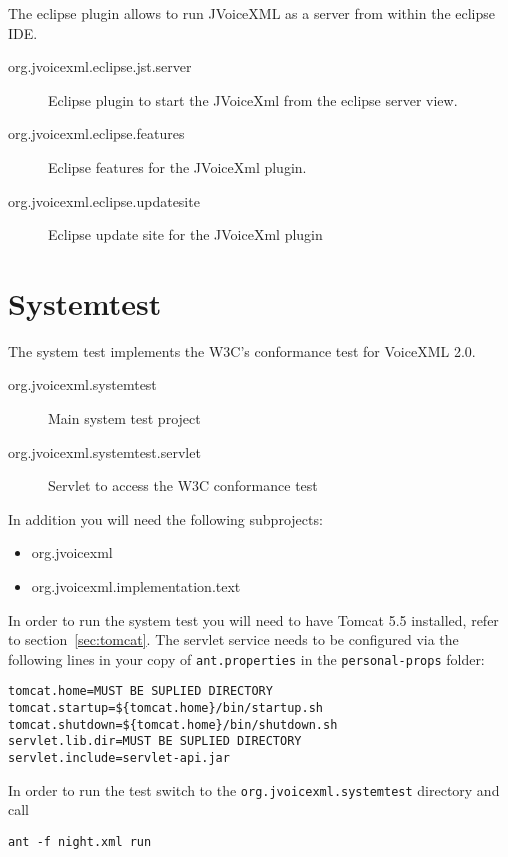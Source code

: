 \documentclass[11pt,a4paper]{article}
\begin{document}
The eclipse plugin allows to run JVoiceXML as a server from within the eclipse
IDE.

\begin{description}
\item[org.jvoicexml.eclipse.jst.server] Eclipse plugin to start the JVoiceXml
from the eclipse server view.
\item[org.jvoicexml.eclipse.features] Eclipse features for the JVoiceXml
plugin.
\item[org.jvoicexml.eclipse.updatesite] Eclipse update site for the
JVoiceXml plugin
\end{description}

\section{Systemtest}

The system test implements the W3C's conformance test for VoiceXML 2.0.

\begin{description}
\item[org.jvoicexml.systemtest] Main system test project
\item[org.jvoicexml.systemtest.servlet] Servlet to access the W3C conformance
test
\end{description}

In addition you will need the following subprojects:
\begin{itemize}
\item org.jvoicexml
\item org.jvoicexml.implementation.text
\end{itemize} 

In order to run the system test you will need to have Tomcat 5.5 installed,
refer to section~\ref{sec:tomcat}. The
servlet service needs to be configured via the following lines in your copy
of \lstinline{ant.properties} in the \lstinline{personal-props} folder:

\begin{lstlisting}
tomcat.home=MUST BE SUPLIED DIRECTORY
tomcat.startup=${tomcat.home}/bin/startup.sh
tomcat.shutdown=${tomcat.home}/bin/shutdown.sh
servlet.lib.dir=MUST BE SUPLIED DIRECTORY
servlet.include=servlet-api.jar
\end{lstlisting}

In order to run the test switch to the \lstinline{org.jvoicexml.systemtest}
directory and call
\begin{lstlisting}
ant -f night.xml run
\end{lstlisting}
\end{document}

